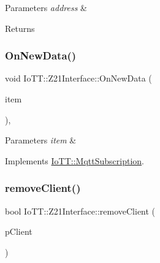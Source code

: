 \begin{DoxyParams}{Parameters}
{\em address} & \\
\hline
\end{DoxyParams}
\begin{DoxyReturn}{Returns}

\end{DoxyReturn}
\mbox{\label{classIoTT_1_1Z21Interface_adcb6084a5d89a8fb1f32fdb81009a90e}} 
\subsubsection{\texorpdfstring{On\+New\+Data()}{OnNewData()}}
{\footnotesize\ttfamily void Io\+T\+T\+::\+Z21\+Interface\+::\+On\+New\+Data (\begin{DoxyParamCaption}\item[{const \hyperlink{classIoTT_1_1mqttMessageQueueItem}{mqtt\+Message\+Queue\+Item} \&}]{item }\end{DoxyParamCaption})\hspace{0.3cm}{\ttfamily [override]}, {\ttfamily [virtual]}}


\begin{DoxyParams}{Parameters}
{\em item} & \\
\hline
\end{DoxyParams}


Implements \hyperlink{classIoTT_1_1MqttSubscription_a9ddc697ad6a842bd88ec0e768d8a1d37}{Io\+T\+T\+::\+Mqtt\+Subscription}.

\mbox{\label{classIoTT_1_1Z21Interface_a16fbab8afaaa86a2c93624238f933631}} 
\subsubsection{\texorpdfstring{remove\+Client()}{removeClient()}}
{\footnotesize\ttfamily bool Io\+T\+T\+::\+Z21\+Interface\+::remove\+Client (\begin{DoxyParamCaption}\item[{\hyperlink{classIoTT_1_1Z21Client}{Z21\+Client} $\ast$}]{p\+Client }\end{DoxyParamCaption})\hspace{0.3cm}{\ttfamily [protected]}}


